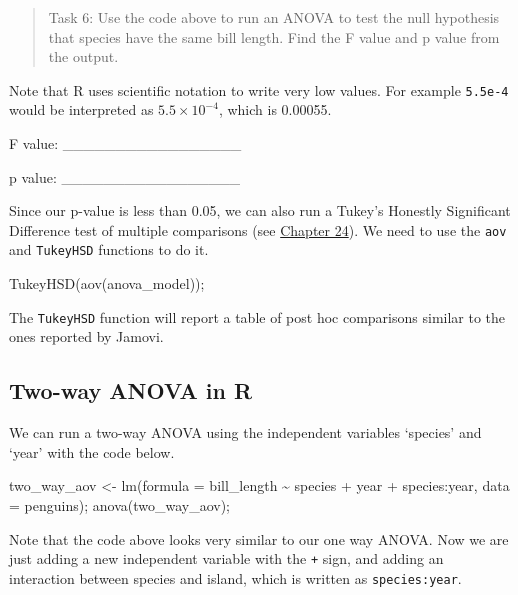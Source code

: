\documentclass[
]{scrbook}
\newenvironment{Shaded}{\begin{snugshade}}{\end{snugshade}}
\newcommand{\AttributeTok}[1]{\textcolor[rgb]{0.77,0.63,0.00}{#1}}
\newcommand{\FunctionTok}[1]{\textcolor[rgb]{0.00,0.00,0.00}{#1}}
\newcommand{\NormalTok}[1]{#1}
\newcommand{\OtherTok}[1]{\textcolor[rgb]{0.56,0.35,0.01}{#1}}
\newcommand{\SpecialCharTok}[1]{\textcolor[rgb]{0.00,0.00,0.00}{#1}}
\begin{document}
\begin{quote}
Task 6: Use the code above to run an ANOVA to test the null hypothesis that species have the same bill length. Find the F value and p value from the output.
\end{quote}

Note that R uses scientific notation to write very low values. For example \texttt{5.5e-4} would be interpreted as \(5.5 \times 10^{-4}\), which is 0.00055.

F value: \_\_\_\_\_\_\_\_\_\_\_\_\_\_\_\_\_

p value: \_\_\_\_\_\_\_\_\_\_\_\_\_\_\_\_\_

Since our p-value is less than 0.05, we can also run a Tukey's Honestly Significant Difference test of multiple comparisons (see \protect\hyperlink{Chapter_24}{Chapter 24}).
We need to use the \texttt{aov} and \texttt{TukeyHSD} functions to do it.

\begin{Shaded}
\begin{Highlighting}[]
\FunctionTok{TukeyHSD}\NormalTok{(}\FunctionTok{aov}\NormalTok{(anova\_model));}
\end{Highlighting}
\end{Shaded}

The \texttt{TukeyHSD} function will report a table of post hoc comparisons similar to the ones reported by Jamovi.

\hypertarget{two-way-anova-in-r}{%
\subsection{Two-way ANOVA in R}\label{two-way-anova-in-r}}

We can run a two-way ANOVA using the independent variables `species' and `year' with the code below.

\begin{Shaded}
\begin{Highlighting}[]
\NormalTok{two\_way\_aov }\OtherTok{\textless{}{-}} \FunctionTok{lm}\NormalTok{(}\AttributeTok{formula =}\NormalTok{  bill\_length }\SpecialCharTok{\textasciitilde{}}\NormalTok{ species }\SpecialCharTok{+}\NormalTok{ year }\SpecialCharTok{+}\NormalTok{ species}\SpecialCharTok{:}\NormalTok{year, }
                  \AttributeTok{data =}\NormalTok{ penguins);}
\FunctionTok{anova}\NormalTok{(two\_way\_aov);}
\end{Highlighting}
\end{Shaded}

Note that the code above looks very similar to our one way ANOVA.
Now we are just adding a new independent variable with the \texttt{+} sign, and adding an interaction between species and island, which is written as \texttt{species:year}.
\end{document}
